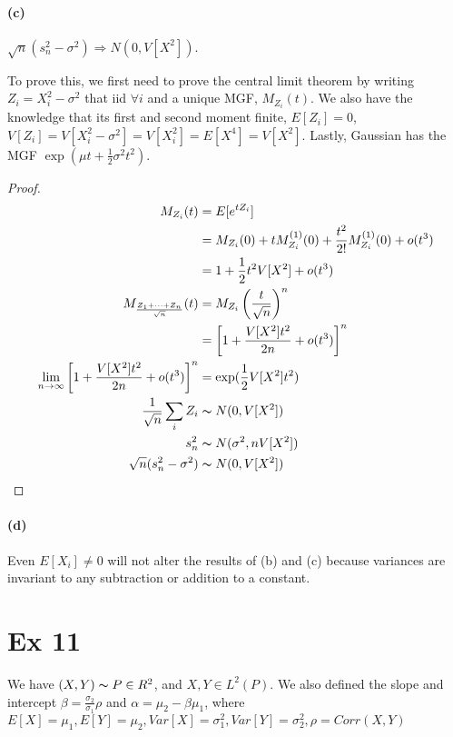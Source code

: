\documentclass[11pt, letterpaper]{article}
\begin{document}
\newpage
\paragraph{(c)}$\sqrt{n}(s^2_n - \sigma^2) \Rightarrow N(0, V[X^2])$.

To prove this, we first need to prove the central limit theorem by writing $Z_i = X_i^2 - \sigma^2$ that iid $\forall i$ and a unique MGF, $M_{Z_i}(t)$. We also have the knowledge that its first and second moment finite, $E[Z_i] = 0$, $V[Z_i] = V[X_i^2 - \sigma^2] = V[X_i^2] = E[X^4] = V[X^2]$. Lastly, Gaussian has the MGF $\exp(\mu t + \frac{1}{2} \sigma^2 t^2)$.
\begin{proof}\begin{align*}
    M_{Z_i}(t) &= E[e^{tZ_i}] \\
        &= M_{Z_i}(0) + tM^{(1)}_{Z_i}(0) + \frac{t^2}{2!}M^{(1)}_{Z_i}(0) + o(t^3) \\
        &= 1 + \frac{1}{2}t^2 V[X^2] + o(t^3) \\
    M_{\frac{Z_1+\dots+Z_n}{\sqrt{n}}}(t) &= {M_{Z_i} \left( \frac{t}{\sqrt{n}} \right)}^n \\
        &= \left[ 1 + \frac{V[X^2] t^2}{2n} + o(t^3) \right]^n \\
    \lim_{n \rightarrow \infty} \left[ 1 + \frac{V[X^2] t^2}{2n} + o(t^3) \right]^n &= \exp(\frac{1}{2} V[X^2] t^2) \\
    \frac{1}{\sqrt{n}}\sum_i Z_i &\thicksim N(0, V[X^2]) \\
    s^2_n &\thicksim N(\sigma^2, nV[X^2]) \\
    \sqrt{n}(s^2_n - \sigma^2) &\thicksim N(0, V[X^2])
\end{align*}\end{proof}

\paragraph{(d)}
Even $E[X_i] \neq 0$ will not alter the results of (b) and (c) because variances are invariant to any subtraction or addition to a constant.

\section{Ex 11}
We have $(X, Y) \thicksim P \in R^2$, and $X, Y \in L^2(P)$. We also defined the slope and intercept $\beta = \frac{\sigma_2}{\sigma_1}\rho$ and $\alpha = \mu_2 - \beta \mu_1$, where $E[X] = \mu_1, E[Y] = \mu_2, Var[X]=\sigma^2_1, Var[Y] = \sigma^2_2, \rho = Corr(X, Y)$
\end{document}
